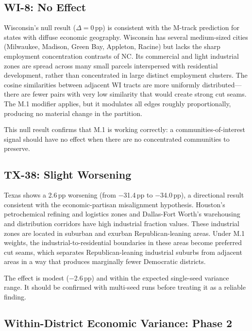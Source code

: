 \subsection{WI-8: No Effect}

Wisconsin's null result ($\Delta = 0$\,pp) is consistent with the M-track
prediction for states with diffuse economic geography.
Wisconsin has several medium-sized cities (Milwaukee, Madison, Green Bay,
Appleton, Racine) but lacks the sharp employment concentration contrasts
of NC.
Its commercial and light industrial zones are spread across many small parcels
interspersed with residential development, rather than concentrated in large
distinct employment clusters.
The cosine similarities between adjacent WI tracts are more uniformly
distributed---there are fewer pairs with very low similarity that would
create strong cut seams.
The M.1 modifier applies, but it modulates all edges roughly proportionally,
producing no material change in the partition.

This null result confirms that M.1 is working correctly: a communities-of-interest
signal should have no effect when there are no concentrated communities to preserve.

\subsection{TX-38: Slight Worsening}

Texas shows a 2.6\,pp worsening (from $-$31.4\,pp to $-$34.0\,pp), a
directional result consistent with the economic-partisan misalignment hypothesis.
Houston's petrochemical refining and logistics zones and Dallas-Fort Worth's
warehousing and distribution corridors have high industrial fraction values.
These industrial zones are located in suburban and exurban Republican-leaning
areas.
Under M.1 weights, the industrial-to-residential boundaries in these areas
become preferred cut seams, which separates Republican-leaning industrial
suburbs from adjacent areas in a way that produces marginally fewer Democratic
districts.

The effect is modest ($-$2.6\,pp) and within the expected single-seed variance
range.
It should be confirmed with multi-seed runs before treating it as a reliable
finding.

\subsection{Within-District Economic Variance: Phase 2}

